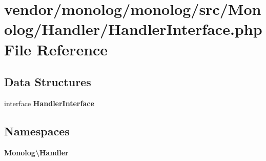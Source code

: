 \section{vendor/monolog/monolog/src/\+Monolog/\+Handler/\+Handler\+Interface.php File Reference}
\label{_handler_interface_8php}
\subsection*{Data Structures}
\begin{DoxyCompactItemize}
\item 
interface {\bf Handler\+Interface}
\end{DoxyCompactItemize}
\subsection*{Namespaces}
\begin{DoxyCompactItemize}
\item 
 {\bf Monolog\textbackslash{}\+Handler}
\end{DoxyCompactItemize}
